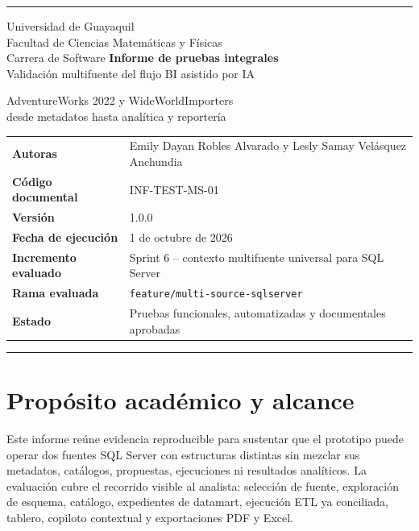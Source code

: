 \documentclass[11pt,letterpaper]{article}
\newcommand{\file}[1]{\texttt{#1}}
\begin{document}
\hypersetup{pageanchor=false}
\begin{titlepage}
  \thispagestyle{empty}
  \vspace*{0.7cm}
  {\color{ugblue}\rule{\textwidth}{2.8pt}}
  \vspace{1.1cm}
  {\Large Universidad de Guayaquil\\[0.2em]
  Facultad de Ciencias Matemáticas y Físicas\\
  Carrera de Software}
  \vfill
  {\color{deepgreen}\fontsize{24}{30}\selectfont\textbf{Informe de pruebas integrales}}\\[0.6em]
  {\LARGE Validación multifuente del flujo BI asistido por IA}\\[0.65em]
  {\large AdventureWorks 2022 y WideWorldImporters\\
  desde metadatos hasta analítica y reportería\par}
  \vspace{1.3cm}
  \begin{tabularx}{\textwidth}{@{}>{\bfseries}l X@{}}
    Autoras & Emily Dayan Robles Alvarado y Lesly Samay Velásquez Anchundia \\
    Código documental & INF-TEST-MS-01 \\
    Versión & 1.0.0 \\
    Fecha de ejecución & 1 de octubre de 2026 \\
    Incremento evaluado & Sprint 6 -- contexto multifuente universal para SQL Server \\
    Rama evaluada & \file{feature/multi-source-sqlserver} \\
    Estado & Pruebas funcionales, automatizadas y documentales aprobadas \\
  \end{tabularx}
  \vfill
  {\color{ugblue}\rule{\textwidth}{2.8pt}}
\end{titlepage}

\hypersetup{pageanchor=true}
\tableofcontents
\newpage
\listoftables
\listoffigures
\newpage
{}

\section{Propósito académico y alcance}

Este informe reúne evidencia reproducible para sustentar que el prototipo puede operar dos
fuentes SQL Server con estructuras distintas sin mezclar sus metadatos, catálogos,
propuestas, ejecuciones ni resultados analíticos. La evaluación cubre el recorrido visible
al analista: selección de fuente, exploración de esquema, catálogo, expedientes de
datamart, ejecución ETL ya conciliada, tablero, copiloto contextual y exportaciones PDF y
Excel.
\end{document}
